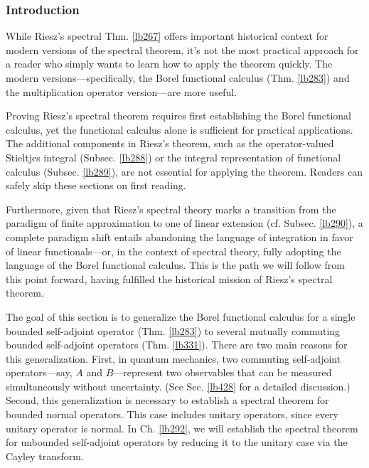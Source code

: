 \documentclass[12pt,b5paper,notitlepage]{article}
\theoremstyle{definition}
\theoremstyle{plain}
\numberwithin{equation}{section}
\begin{document}
\subsubsection{Introduction}


While Riesz's spectral Thm. \ref{lb267} offers important historical context for modern versions of the spectral theorem, it's not the most practical approach for a reader who simply wants to learn how to apply the theorem quickly. The modern versions---specifically, the Borel functional calculus (Thm. \ref{lb283}) and the multiplication operator version---are more useful.

Proving Riesz's spectral theorem requires first establishing the Borel functional calculus, yet the functional calculus alone is sufficient for practical applications. The additional components in Riesz's theorem, such as the operator-valued Stieltjes integral (Subsec. \ref{lb288}) or the integral representation of functional calculus (Subsec. \ref{lb289}), are not essential for applying the theorem. Readers can safely skip these sections on first reading.

Furthermore, given that Riesz's spectral theory marks a transition from the paradigm of finite approximation to one of linear extension (cf. Subsec. \ref{lb290}), a complete paradigm shift entails abandoning the language of integration in favor of linear functionals---or, in the context of spectral theory, fully adopting the language of the Borel functional calculus. This is the path we will follow from this point forward, having fulfilled the historical mission of Riesz's spectral theorem.



The goal of this section is to generalize the Borel functional calculus for a single bounded self-adjoint operator (Thm. \ref{lb283}) to several mutually commuting bounded self-adjoint operators (Thm. \ref{lb331}). There are two main reasons for this generalization. First, in quantum mechanics, two commuting self-adjoint operators---say, $A$ and $B$---represent two observables that can be measured simultaneously without uncertainty. (See Sec. \ref{lb428} for a detailed discussion.) Second, this generalization is necessary to establish a spectral theorem for bounded normal operators. This case includes unitary operators, since every unitary operator is normal. In Ch. \ref{lb292}, we will establish the spectral theorem for unbounded self-adjoint operators by reducing it to the unitary case via the Cayley transform.
\end{document}
